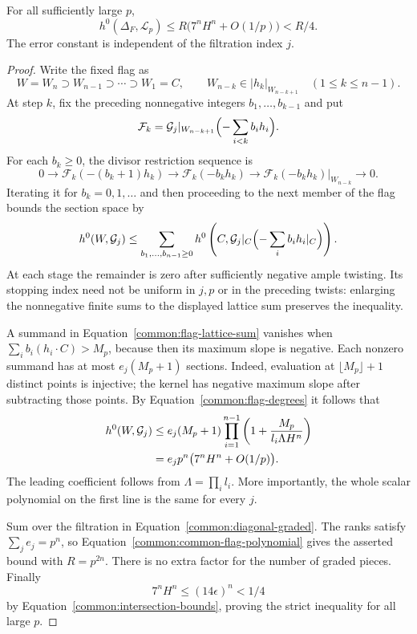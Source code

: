 \begin{lemma}\label{common:diagonal-sections}
For all sufficiently large $p$,
\[
 h^0(\Delta_F,\mathcal L_p)
 \le R\bigl(7^nH^n+O(1/p)\bigr)<R/4.
\]
The error constant is independent of the filtration index $j$.
\end{lemma}

\begin{proof}
Write the fixed flag as
\[
 W=W_n\supset W_{n-1}\supset\cdots\supset W_1=C,
 \qquad W_{n-k}\in|h_k|_{W_{n-k+1}}
 \quad(1\le k\le n-1).
\]
At step $k$, fix the preceding nonnegative integers
$b_1,\ldots,b_{k-1}$ and put
\[
 \mathcal F_k=
 \mathcal G_j|_{W_{n-k+1}}
 \Bigl(-\sum_{i<k}b_i h_i\Bigr).
\]
For each $b_k\ge0$, the divisor restriction sequence is
\[
 0\longrightarrow\mathcal F_k(-(b_k+1)h_k)
 \longrightarrow\mathcal F_k(-b_kh_k)
 \longrightarrow
 \mathcal F_k(-b_kh_k)|_{W_{n-k}}
 \longrightarrow0.
\]
Iterating it for $b_k=0,1,\ldots$ and then proceeding to the next
member of the flag bounds the section space by
\begin{equation}\label{common:flag-lattice-sum}
 h^0(W,\mathcal G_j)\le
 \sum_{b_1,\ldots,b_{n-1}\ge0}
 h^0\left(C,\mathcal G_j|_C\Bigl(-\sum_i b_i h_i|_C\Bigr)\right).
\end{equation}
At each stage the remainder is zero after sufficiently negative
ample twisting.  Its stopping index need not be uniform in $j,p$
or in the preceding twists: enlarging the nonnegative finite sums
to the displayed lattice sum preserves the inequality.

A summand in Equation~\eqref{common:flag-lattice-sum} vanishes when
$\sum_i b_i(h_i\cdot C)>M_p$, because then its maximum slope is
negative.  Each nonzero summand has at most $e_j(M_p+1)$ sections.
Indeed, evaluation at $\lfloor M_p\rfloor+1$ distinct points is injective;
the kernel has negative maximum slope after subtracting those
points.  By Equation~\eqref{common:flag-degrees} it follows that
\begin{align}
 h^0(W,\mathcal G_j)
 &\le e_j(M_p+1)
       \prod_{i=1}^{n-1}
       \left(1+\frac{M_p}{l_i\Lambda H^n}\right)\notag\\
 &=e_jp^n\bigl(7^nH^n+O(1/p)\bigr).
 \label{common:common-flag-polynomial}
\end{align}
The leading coefficient follows from
$\Lambda=\prod_i l_i$.  More importantly, the whole scalar
polynomial on the first line is the same for every $j$.

Sum over the filtration in Equation~\eqref{common:diagonal-graded}.  The ranks
satisfy $\sum_j e_j=p^n$, so Equation~\eqref{common:common-flag-polynomial} gives
the asserted bound with $R=p^{2n}$.  There is no extra factor for
the number of graded pieces.  Finally
\[
 7^nH^n\le(14\epsilon)^n<1/4
\]
by Equation~\eqref{common:intersection-bounds}, proving the strict inequality
for all large $p$.
\end{proof}

